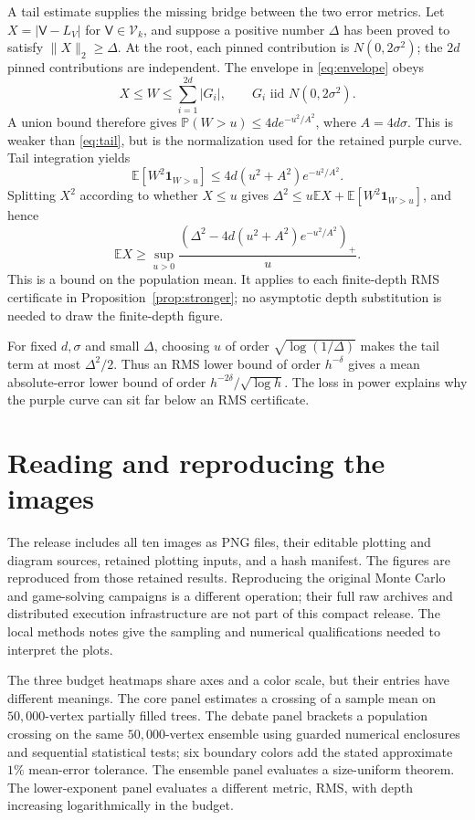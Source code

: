 \documentclass[11pt]{article}
\theoremstyle{definition}
\theoremstyle{remark}
\newcommand{\E}{\mathbb E}
\newcommand{\Prob}{\mathbb P}
\newcommand{\Vcl}{\mathcal V}
\begin{document}
A tail estimate supplies the missing bridge between the two error metrics.
Let $X=|\mathsf V-L_V|$ for $\mathsf V\in\Vcl_k$, and suppose a positive number $\Delta$
has been proved to satisfy $\|X\|_2\ge\Delta$. At the root, each pinned
contribution is $N(0,2\sigma^2)$; the $2d$ pinned contributions are
independent. The envelope in \eqref{eq:envelope} obeys
\[
 X\le W\le\sum_{i=1}^{2d}|G_i|,\qquad G_i\text{ iid }N(0,2\sigma^2).
\]
A union bound therefore gives
$\Prob(W>u)\le4d e^{-u^2/A^2}$, where $A=4d\sigma$.
This is weaker than \eqref{eq:tail}, but is the normalization used for
the retained purple curve. Tail integration yields
\[
 \E[W^2\mathbf1_{W>u}]\le4d(u^2+A^2)e^{-u^2/A^2}.
\]
Splitting $X^2$ according to whether $X\le u$ gives
$\Delta^2\le u\E X+\E[W^2\mathbf1_{W>u}]$, and hence
\begin{equation}
 \boxed{\E X\ge\sup_{u>0}
 \frac{(\Delta^2-4d(u^2+A^2)e^{-u^2/A^2})_+}{u}.}
 \label{eq:lone}
\end{equation}
This is a bound on the population mean. It applies to each finite-depth
RMS certificate in Proposition~\ref{prop:stronger}; no asymptotic depth
substitution is needed to draw the finite-depth figure.

For fixed $d,\sigma$ and small $\Delta$, choosing $u$ of order
$\sqrt{\log(1/\Delta)}$ makes the tail term at most $\Delta^2/2$.
Thus an RMS lower bound of order $h^{-\delta}$ gives a mean absolute-error
lower bound of order $h^{-2\delta}/\sqrt{\log h}$. The loss in power
explains why the purple curve can sit far below an RMS certificate.

\section{Reading and reproducing the images}
\label{app:figures}

The release includes all ten images as PNG files, their editable plotting
and diagram sources, retained plotting inputs, and a hash manifest.
The figures are reproduced from those retained results. Reproducing the
original Monte Carlo and game-solving campaigns is a different operation;
their full raw archives and distributed execution infrastructure are not
part of this compact release. The local methods notes give the sampling
and numerical qualifications needed to interpret the plots.

The three budget heatmaps share axes and a color scale, but their entries
have different meanings. The core panel estimates a crossing of a sample
mean on $50{,}000$-vertex partially filled trees. The debate panel brackets
a population crossing on the same $50{,}000$-vertex ensemble using guarded
numerical enclosures and sequential statistical tests; six boundary colors
add the stated approximate $1\%$ mean-error tolerance. The ensemble panel evaluates
a size-uniform theorem. The lower-exponent panel evaluates a different
metric, RMS, with depth increasing logarithmically in the budget.
\end{document}
